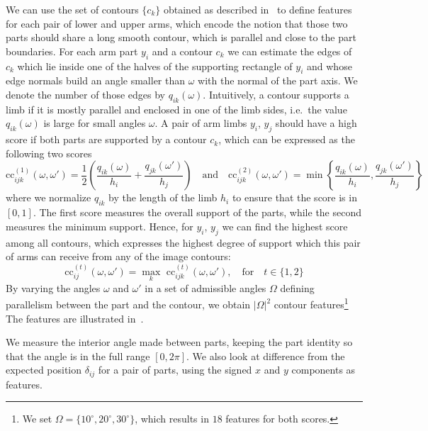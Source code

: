  We can use the set of contours $\{c_k\}$ 
obtained as described in~ to define features for each pair of 
lower and upper arms, which encode the notion that those two parts should share 
a long smooth contour, which is parallel and close to the part boundaries. For 
each arm part $y_i$ and a contour $c_k$ we can estimate the edges of $c_k$ 
which lie inside one of the halves of the supporting rectangle of $y_i$ and 
whose edge normals build an angle smaller than $\omega$ with the normal of the 
part axis.  We denote the number of those edges by $q_{ik}(\omega)$.  
Intuitively, a contour supports a limb if it is mostly parallel and enclosed in 
one of the limb sides, i.e.~the value $q_{ik}(\omega)$ is large for small 
angles $\omega$. A pair of arm limbs $y_i$, $y_j$ should have a high score if 
both parts are supported by a contour $c_k$, which can be expressed as the 
following two scores
\[
  \textrm{cc}_{ijk}^{(1)}(\omega, \omega') = \frac{1}{2}\left(\frac{q_{ik}(\omega)}{h_i} + \frac{q_{jk}(\omega')}{h_j}\right)\quad\textrm{and}\quad\textrm{cc}_{ijk}^{(2)}(\omega, \omega') = \min\left\{\frac{q_{ik}(\omega)}{h_i}, \frac{q_{jk}(\omega')}{h_j}\right\}
\]
where we normalize $q_{ik}$ by the length of the limb $h_i$ to ensure that the 
score is in $[0,1]$. The first score measures the overall support of the parts, 
while the second measures the minimum support. Hence, for $y_i$, $y_j$ we can 
find the highest score among all contours, which expresses the highest degree 
of support which this pair of arms can receive from any of the image contours:
\[
\textrm{cc}_{ij}^{(t)}(\omega, \omega') = \max_{k} \textrm{ 
cc}_{ijk}^{(t)}(\omega, \omega'), \quad\textrm{for} \quad t\in\{1,2\}
\]
By varying the angles $\omega$ and $\omega'$ in a set of admissible angles 
$\Omega$ defining parallelism between the part and the contour, we obtain 
$|\Omega|^2$ contour features\footnote{We set $\Omega=\{10^\circ, 20^\circ, 
30^\circ\}$, which results in $18$ features for both scores.}  The features are 
illustrated in~.

 We measure the interior angle made between parts, 
keeping the part identity so that the angle is in the full range $[0,2\pi]$.  
We also look at difference from the expected position $\delta_{ij}$ for a pair 
of parts, using the signed $x$ and $y$ components as features.

